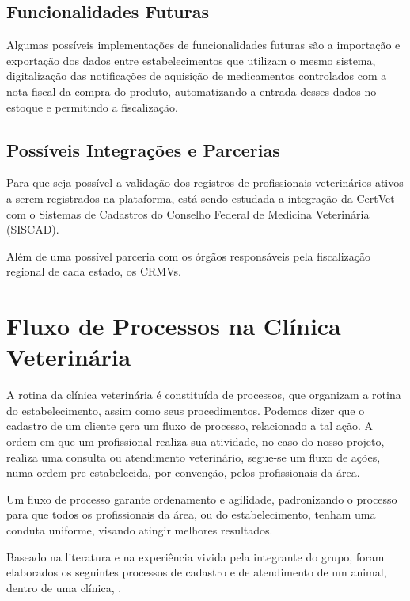 \documentclass[
    12pt,               %
    openright,          %
    oneside,
    a4paper,            %
    BIBLATEX,           %
    TODO,               %
    english,            %
    brazil              %
    ]{ifsp-spo-inf-ctds}
\begin{document}
        \subsection{Funcionalidades Futuras}

            Algumas possíveis implementações de funcionalidades futuras são a importação e exportação dos dados entre estabelecimentos que utilizam o mesmo sistema, digitalização das notificações de aquisição de medicamentos controlados com a nota fiscal da compra do produto, automatizando a entrada desses dados no estoque e permitindo a fiscalização.

        \subsection{Possíveis Integrações e Parcerias}

            Para que seja possível a validação dos registros de profissionais veterinários ativos a serem registrados na plataforma, está sendo estudada a integração da CertVet com o Sistemas de Cadastros do Conselho Federal de Medicina Veterinária (SISCAD).

            Além de uma possível parceria com os órgãos responsáveis pela fiscalização regional de cada estado, os CRMVs.

    \section{Fluxo de Processos na Clínica Veterinária}

    A rotina da clínica veterinária é constituída de processos, que organizam a rotina do estabelecimento, assim como seus procedimentos. Podemos dizer que o cadastro de um cliente gera um fluxo de processo, relacionado a tal ação. A ordem em que um profissional realiza sua atividade, no caso do nosso projeto, realiza uma consulta ou atendimento veterinário, segue-se um fluxo de ações, numa ordem pre-estabelecida, por convenção, pelos profissionais da área. 

    Um fluxo de processo garante ordenamento e agilidade, padronizando o processo para que todos os profissionais da área, ou do estabelecimento, tenham uma conduta uniforme, visando atingir melhores resultados.

    Baseado na literatura e na experiência vivida pela integrante do grupo, foram elaborados os seguintes processos de cadastro e de atendimento de um animal, dentro de uma clínica, .
\end{document}
